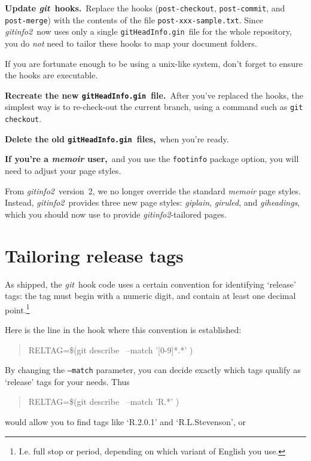 \documentclass[draft,a4paper,12pt,twoside,openany]{memoir}
\newcommand{\bpara}[1]{\par\vspace{\beforeparaskip}\noindent\textbf{#1}\,}
\newcommand{\sfit}[1]{\textit{#1}}
\newcommand{\git}{\sfit{git}}
\newcommand{\tpname}{\sfit{gitinfo2}}
\newcommand{\ginname}{gitHeadInfo.gin}
\newcommand{\metaname}{\texttt{\ginname}}
\begin{document}
\bpara{Update \git\ hooks.}
Replace the hooks (\texttt{post-checkout}, \texttt{post-commit},
and \texttt{post-merge}) with the contents of the file \texttt{post-xxx-sample.txt}.
Since \tpname\ now uses only a single \metaname\ file for the whole repository,
you do \emph{not} need to tailor these hooks to map your document folders.

If you are fortunate enough to be using a unix-like system,
don't forget to ensure the hooks are executable.

\bpara{Recreate the new \metaname\ file.}
After you've replaced the hooks, the simplest way is to re-check-out the current branch,
using a command such as \verb!git checkout!.

\bpara{Delete the old \metaname\ files,}
when you're ready.

\bpara{If you're a \sfit{memoir} user,}
and you use the \texttt{footinfo} package option,
you will need to adjust your page styles.

From \tpname\ version~2, we no longer override the standard \sfit{memoir}
page styles.
Instead, \tpname\ provides three new page styles:
\sfit{giplain}, \sfit{giruled}, and \sfit{giheadings},
which you should now use to provide \tpname-tailored pages.

\section{Tailoring release tags}

As shipped, the \git\ hook code uses a certain convention
for identifying `release' tags:
the tag must begin with a numeric digit, and contain at least one decimal
point.\footnote{I.e. full stop or period, depending on which variant of English you use.}

Here is the line in the hook where this convention is established:

\begin{quotation}
{\ttfamily
RELTAG=\$(git describe \textellipsis\ --match '[0-9]*.*' \textellipsis)
}
\end{quotation}

By changing the \texttt{--match} parameter, you can decide exactly which tags
qualify as `release' tags for your needs. Thus

\begin{quotation}
{\ttfamily
RELTAG=\$(git describe \textellipsis\ --match 'R.*' \textellipsis)
}
\end{quotation}
would allow you to find tags like `R.2.0.1' and `R.L.Stevenson',
or
\end{document}
